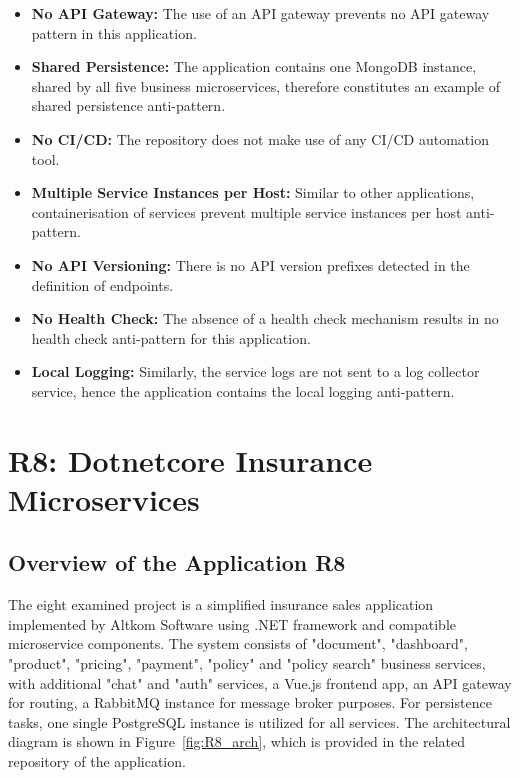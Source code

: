 \documentclass{Configuration_Files/PoliMi3i_thesis}
\begin{document}
\begin{itemize}
    \item \textbf{No API Gateway:} The use of an API gateway prevents no API gateway pattern in this application.
    
    \item \textbf{Shared Persistence:} The application contains one MongoDB instance, shared by all five business microservices, therefore constitutes an example of shared persistence anti-pattern.
    
    \item \textbf{No CI/CD:} The repository does not make use of any CI/CD automation tool.
    
    \item \textbf{Multiple Service Instances per Host:} Similar to other applications, containerisation of services prevent multiple service instances per host anti-pattern.
    
    \item \textbf{No API Versioning:} There is no API version prefixes detected in the definition of endpoints.
    
    \item \textbf{No Health Check:} The absence of a health check mechanism results in no health check anti-pattern for this application.
    
    \item \textbf{Local Logging:} Similarly, the service logs are not sent to a log collector service, hence the application contains the local logging anti-pattern.
\end{itemize}

\section{R8: Dotnetcore Insurance Microservices}
\label{sec:R8}

\subsection{Overview of the Application R8}
\label{subsec:R8_overview}

The eight examined project is a simplified insurance sales application implemented by Altkom Software\footnotemark[102] using .NET framework and compatible microservice components.
The system consists of "document", "dashboard", "product", "pricing", "payment", "policy" and "policy search" business services, with additional "chat" and "auth" services, a Vue.js frontend app, an API gateway for routing, a RabbitMQ instance for message broker purposes.
For persistence tasks, one single PostgreSQL instance is utilized for all services.
The architectural diagram is shown in Figure~\ref{fig:R8_arch}, which is provided in the related repository of the application.
\end{document}
